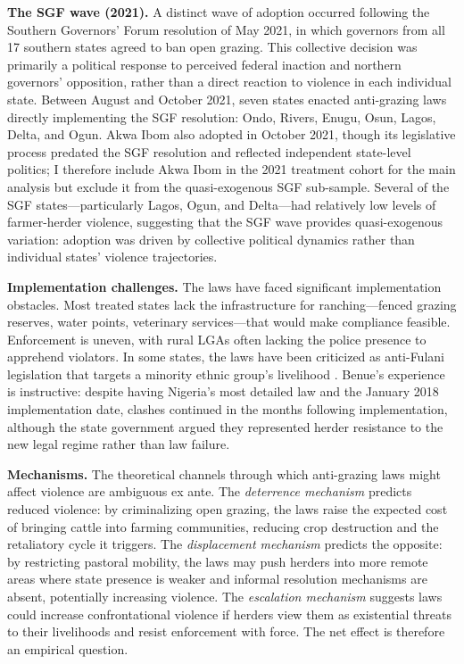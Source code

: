 \documentclass[12pt]{article}
\begin{document}
\textbf{The SGF wave (2021).} A distinct wave of adoption occurred following the Southern Governors' Forum resolution of May 2021, in which governors from all 17 southern states agreed to ban open grazing. This collective decision was primarily a political response to perceived federal inaction and northern governors' opposition, rather than a direct reaction to violence in each individual state. Between August and October 2021, seven states enacted anti-grazing laws directly implementing the SGF resolution: Ondo, Rivers, Enugu, Osun, Lagos, Delta, and Ogun. Akwa Ibom also adopted in October 2021, though its legislative process predated the SGF resolution and reflected independent state-level politics; I therefore include Akwa Ibom in the 2021 treatment cohort for the main analysis but exclude it from the quasi-exogenous SGF sub-sample. Several of the SGF states---particularly Lagos, Ogun, and Delta---had relatively low levels of farmer-herder violence, suggesting that the SGF wave provides quasi-exogenous variation: adoption was driven by collective political dynamics rather than individual states' violence trajectories.

\textbf{Implementation challenges.} The laws have faced significant implementation obstacles. Most treated states lack the infrastructure for ranching---fenced grazing reserves, water points, veterinary services---that would make compliance feasible. Enforcement is uneven, with rural LGAs often lacking the police presence to apprehend violators. In some states, the laws have been criticized as anti-Fulani legislation that targets a minority ethnic group's livelihood \citep{ochonu2022anti}. Benue's experience is instructive: despite having Nigeria's most detailed law and the January 2018 implementation date, clashes continued in the months following implementation, although the state government argued they represented herder resistance to the new legal regime rather than law failure.

\textbf{Mechanisms.} The theoretical channels through which anti-grazing laws might affect violence are ambiguous ex ante. The \textit{deterrence mechanism} predicts reduced violence: by criminalizing open grazing, the laws raise the expected cost of bringing cattle into farming communities, reducing crop destruction and the retaliatory cycle it triggers. The \textit{displacement mechanism} predicts the opposite: by restricting pastoral mobility, the laws may push herders into more remote areas where state presence is weaker and informal resolution mechanisms are absent, potentially increasing violence. The \textit{escalation mechanism} suggests laws could increase confrontational violence if herders view them as existential threats to their livelihoods and resist enforcement with force. The net effect is therefore an empirical question.
\end{document}
